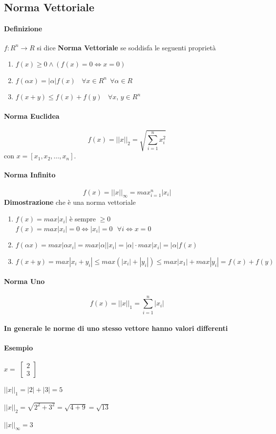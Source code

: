 \documentclass[10pt]{book}
\begin{document}
\subsection{Norma Vettoriale}
\paragraph{Definizione} $f: R^n \rightarrow R$ si dice \textbf{Norma Vettoriale} se soddisfa le seguenti proprietà
\begin{enumerate}
	\item $f(x) \geq 0 \wedge (f(x) = 0 \Leftrightarrow x = 0)$
	\item $f(\alpha x) = |\alpha|f(x)\:\:\:\:\forall x \in R^n\:\:\forall\alpha\in R$
	\item $f(x + y) \leq f(x) + f(y)\:\:\:\:\forall x$, $y \in R^n$
\end{enumerate}
\pagebreak
\paragraph{Norma Euclidea} $$f(x) = ||x||_2 = \sqrt{\sum_{i = 1}^n x_i^2}$$ con $x = \left[x_1, x_2, \ldots, x_n\right]$.
\paragraph{Norma Infinito} $$f(x) = ||x||_\infty = max_{i = 1}^n |x_i|$$
\textbf{Dimostrazione} che è una norma vettoriale
\begin{enumerate}
	\item $f(x) = max |x_i|$ è sempre $\geq 0$\\
	$f(x) = max |x_i| = 0 \Leftrightarrow |x_i| = 0\:\:\:\forall i \Leftrightarrow x = 0$
	\item $f(\alpha x) = max |\alpha x_i| = max |\alpha||x_i| = |\alpha|\cdot max |x_i| = |\alpha|f(x)$
	\item $f(x + y) = max |x_i + y_i| \leq max(|x_i| + |y_i|) \leq max|x_1| + max|y_i| = f(x) + f(y)$
\end{enumerate}
\paragraph{Norma Uno} $$f(x) = ||x||_1 = \sum_{i = 1}^n |x_i|$$
\paragraph{In generale le norme di uno stesso vettore hanno valori differenti}
\paragraph{Esempio} $x = $
\begin{math}
	\left[
	\begin{array}{c}
		2\\3
	\end{array}
	\right]
\end{math}
\begin{list}{}{}
	\item $||x||_1 = |2| + |3| = 5$
	\item $||x||_2 = \sqrt{2^2 + 3^2} = \sqrt{4 + 9} = \sqrt{13}$
	\item $||x||_\infty = 3$
\end{list}
\end{document}
